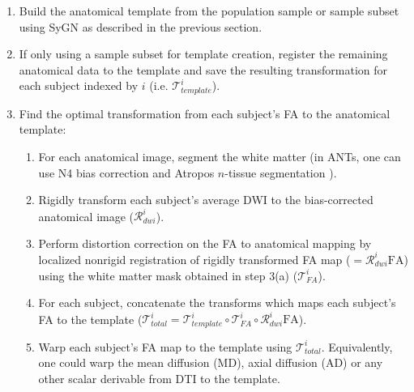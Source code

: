 \documentclass[final,5p,times,twocolumn]{elsarticle}
\begin{document}
\begin{enumerate}
  \item Build the anatomical template from  the population sample or sample subset using SyGN as described in
  the previous section.
  \item If only using a sample subset for template creation, register the remaining
        anatomical data to the template and save the resulting transformation for each         
        subject indexed by $i$ (i.e. $\mathcal{T}^i_{template}$).
  \item Find the optimal transformation from each
        subject's FA to the anatomical template:
  \begin{enumerate}
  \item For each anatomical image, segment the white matter (in ANTs, one can use N4 bias correction \citep{Tustison2010} and Atropos $n$-tissue segmentation \citep{Avants2011a}).
  \item Rigidly transform each subject's average DWI to the bias-corrected anatomical image ($\mathcal{R}^i_{dwi}$).
  \item Perform distortion correction on the FA to anatomical mapping 
        by localized nonrigid registration
        of rigidly transformed FA map ($=\mathcal{R}^i_{dwi} \mathrm{FA}$) using
        the white matter mask obtained in step 3(a) ($\mathcal{T}^i_{FA}$).
  \item For each subject, concatenate the transforms which maps each
        subject's FA to the template ($\mathcal{T}^i_{total} = \mathcal{T}^i_{template} \circ 
        \mathcal{T}^i_{FA} \circ \mathcal{R}^i_{dwi} \mathrm{FA}$).
  \item Warp each subject's FA map to the template using $\mathcal{T}^i_{total}$.  
  Equivalently, one could warp the mean diffusion (MD), axial diffusion (AD) or any 
  other scalar derivable from DTI to the template.  
  \end{enumerate}      
\end{enumerate}
\end{document}
